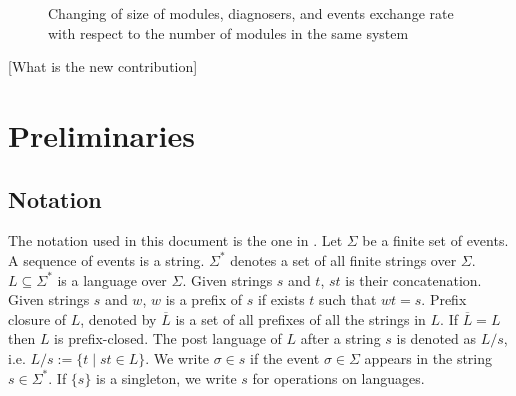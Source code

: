 \documentclass[a4paper, 10pt, conference]{ieeeconf}
\begin{document}
\begin{figure}
\caption{Changing of size of modules, diagnosers, and events exchange rate
with respect to the number of modules in the same system}
\label{fig:curves}
\end{figure}

[What is the new contribution]


\section{Preliminaries}
\label{sec:Preliminaries}

\subsection{Notation}
The notation used in this document is the one in
\cite{cassandras_introduction_2010}.
Let $\Sigma$ be a finite set of events. A sequence of events is a string.
$\Sigma^*$ denotes a set of all finite strings over $\Sigma$.
$L\subseteq\Sigma^*$ is a language over $\Sigma$. Given strings $s$ and $t$,
$st$ is their concatenation. Given strings $s$ and $w$, $w$ is a prefix of $s$
if exists $t$ such that $wt = s$. Prefix closure of $L$, denoted by
$\overline{L}$ is a set of all prefixes of all the strings in $L$.
If $\overline{L} = L$ then $L$ is prefix-closed. The post language of $L$ after
a string $s$ is denoted as $L/s$, i.e. $L/s := \{t\mid st \in L\}$. We
write $\sigma \in s$ if the event $\sigma \in \Sigma$ appears in the string $s
\in \Sigma^*$. If $\{s\}$ is a singleton, we write $s$ for operations on
languages.
\end{document}
